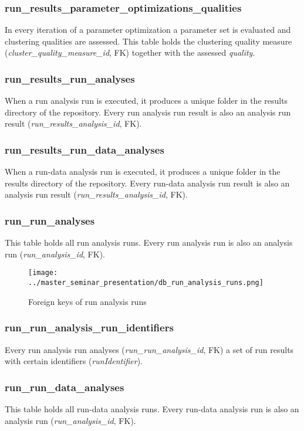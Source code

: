 	\subsubsection{run\_results\_parameter\_optimizations\_qualities}
	In every iteration of a parameter optimization a parameter set is evaluated and clustering qualities are assessed. This table holds the clustering quality measure (\textit{cluster\_quality\_measure\_id}, FK) together with the assessed \textit{quality}.
	
	\subsubsection{run\_results\_run\_analyses}
	When a run analysis run is executed, it produces a unique folder in the results directory of the repository. Every run analysis run result is also an analysis run result (\textit{run\_results\_analysis\_id}, FK).
	
	\subsubsection{run\_results\_run\_data\_analyses}
	When a run-data analysis run is executed, it produces a unique folder in the results directory of the repository. Every run-data analysis run result is also an analysis run result (\textit{run\_results\_analysis\_id}, FK).
	
	\subsubsection{run\_run\_analyses}
	This table holds all run analysis runs. Every run analysis run is also an analysis run (\textit{run\_analysis\_id}, FK).

\begin{figure}[hbtp]
\caption{Foreign keys of run analysis runs}
\label{fig_run_analysis_runs_foreign_keys}
\centering
\texttt{[image: ../master\_seminar\_presentation/db\_run\_analysis\_runs.png]}
\end{figure} 
	
	\subsubsection{run\_run\_analysis\_run\_identifiers}
	Every run analysis run analyses (\textit{run\_run\_analysis\_id}, FK) a set of run results with certain identifiers (\textit{runIdentifier}).
	
	\subsubsection{run\_run\_data\_analyses}
	This table holds all run-data analysis runs. Every run-data analysis run is also an analysis run (\textit{run\_analysis\_id}, FK).

